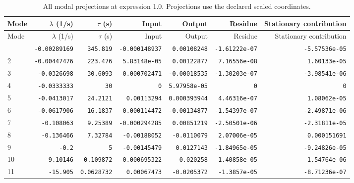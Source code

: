 \begingroup\scriptsize
\setlength{\tabcolsep}{3pt}
\begin{longtable}{lrrrrrr}
\caption{All modal projections at expression 1.0. Projections use the declared scaled coordinates.}\\
\toprule
Mode & $\lambda$ (1/s) & $\tau$ (s) & Input & Output & Residue & Stationary contribution \\
\midrule\endfirsthead
\toprule
Mode & $\lambda$ (1/s) & $\tau$ (s) & Input & Output & Residue & Stationary contribution \\
\midrule\endhead
\bottomrule\endfoot
1 & \texttt{-0.00289169} & \texttt{345.819} & \texttt{-0.000148937} & \texttt{0.00108248} & \texttt{-1.61222e-07} & \texttt{-5.57536e-05} \\
2 & \texttt{-0.00447476} & \texttt{223.476} & \texttt{5.83148e-05} & \texttt{0.00122877} & \texttt{7.16556e-08} & \texttt{1.60133e-05} \\
3 & \texttt{-0.0326698} & \texttt{30.6093} & \texttt{0.000702471} & \texttt{-0.00018535} & \texttt{-1.30203e-07} & \texttt{-3.98541e-06} \\
4 & \texttt{-0.0333333} & \texttt{30} & \texttt{0} & \texttt{5.97958e-05} & \texttt{0} & \texttt{0} \\
5 & \texttt{-0.0413017} & \texttt{24.2121} & \texttt{0.00113294} & \texttt{0.000393944} & \texttt{4.46316e-07} & \texttt{1.08062e-05} \\
6 & \texttt{-0.0617906} & \texttt{16.1837} & \texttt{0.000114472} & \texttt{-0.00134877} & \texttt{-1.54397e-07} & \texttt{-2.49871e-06} \\
7 & \texttt{-0.108063} & \texttt{9.25389} & \texttt{-0.000294285} & \texttt{0.00851219} & \texttt{-2.50501e-06} & \texttt{-2.31811e-05} \\
8 & \texttt{-0.136466} & \texttt{7.32784} & \texttt{-0.00188052} & \texttt{-0.0110079} & \texttt{2.07006e-05} & \texttt{0.000151691} \\
9 & \texttt{-0.2} & \texttt{5} & \texttt{-0.00145479} & \texttt{0.0127143} & \texttt{-1.84965e-05} & \texttt{-9.24826e-05} \\
10 & \texttt{-9.10146} & \texttt{0.109872} & \texttt{0.000695322} & \texttt{0.020258} & \texttt{1.40858e-05} & \texttt{1.54764e-06} \\
11 & \texttt{-15.905} & \texttt{0.0628732} & \texttt{0.00067473} & \texttt{-0.0205372} & \texttt{-1.3857e-05} & \texttt{-8.71236e-07} \\
\end{longtable}
\endgroup


